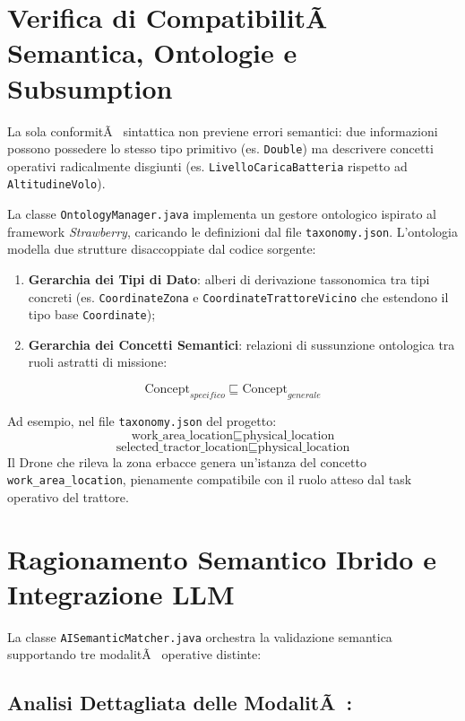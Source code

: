 ﻿\documentclass[11pt, a4paper]{report}
\begin{document}
\section{Verifica di CompatibilitÃ  Semantica, Ontologie e Subsumption}

La sola conformitÃ  sintattica non previene errori semantici: due informazioni possono possedere lo stesso tipo primitivo (es. \texttt{Double}) ma descrivere concetti operativi radicalmente disgiunti (es. \texttt{LivelloCaricaBatteria} rispetto ad \texttt{AltitudineVolo}).

La classe \texttt{OntologyManager.java} implementa un gestore ontologico ispirato al framework \textit{Strawberry}, caricando le definizioni dal file \texttt{taxonomy.json}. L'ontologia modella due strutture disaccoppiate dal codice sorgente:
\begin{enumerate}
    \item \textbf{Gerarchia dei Tipi di Dato}: alberi di derivazione tassonomica tra tipi concreti (es. \texttt{CoordinateZona} e \texttt{CoordinateTrattoreVicino} che estendono il tipo base \texttt{Coordinate});
    \item \textbf{Gerarchia dei Concetti Semantici}: relazioni di sussunzione ontologica tra ruoli astratti di missione:
\end{enumerate}

$$\text{Concept}_{specifico} \sqsubseteq \text{Concept}_{generale}$$

Ad esempio, nel file \texttt{taxonomy.json} del progetto:
$$\text{work\_area\_location} \sqsubseteq \text{physical\_location}$$
$$\text{selected\_tractor\_location} \sqsubseteq \text{physical\_location}$$
Il Drone che rileva la zona erbacce genera un'istanza del concetto \texttt{work\_area\_location}, pienamente compatibile con il ruolo atteso dal task operativo del trattore.

\section{Ragionamento Semantico Ibrido e Integrazione LLM}

La classe \texttt{AISemanticMatcher.java} orchestra la validazione semantica supportando tre modalitÃ  operative distinte:

\subsection{Analisi Dettagliata delle ModalitÃ :}
\end{document}
